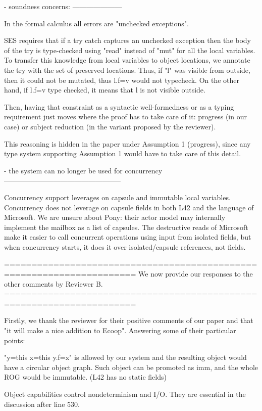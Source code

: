 - soundness concerns:
---------------------

In the formal calculus all errors are "unchecked exceptions".

SES requires that if a try catch captures an unchecked exception then the body of the try
is type-checked using "read" instead of "mut" for all the local variables.
To transfer this knowledge from local variables to object locations, we annotate the try with
the set of preserved locations.
Thus, if "l" was visible from outside, then it could not be mutated, thus l.f=v would not typecheck.
On the other hand, if l.f=v type checked, it means that l is not visible outside.

Then, having that constraint as a syntactic well-formedness or as a typing requirement just moves 
where the proof has to take care of it: progress (in our case) or subject reduction
(in the variant proposed by the reviewer).

This reasoning is hidden in the paper under Assumption 1 (progress), since any type system
supporting Assumption 1 would have to take care of this detail.

- the system can no longer be used for concurrency
--------------------------------------------------

Concurrency support leverages on capsule and immutable local variables.
Concurrency does not leverage on capsule fields in both L42 and the language of Microsoft.
We are unsure about Pony: their actor model may internally implement the mailbox as a list of capsules.
The destructive reads of Microsoft make it easier to call concurrent operations using input
from isolated fields, but when concurrency starts, it does it over isolated/capsule references, not fields.

======================================================================
We now provide our responses to the other comments by Reviewer B.
======================================================================

Firstly, we thank the reviewer for their positive comments of our paper and that "it will make a nice addition to Ecoop".
Answering some of their particular points: 

"y=this x=this y.f=x" is allowed by our system and the resulting object would have a circular object graph.
Such object can be promoted as imm, and the whole ROG would be immutable.
(L42 has no static fields)

Object capabilities control nondeterminism and I/O. They are essential in the discussion after line 530.


